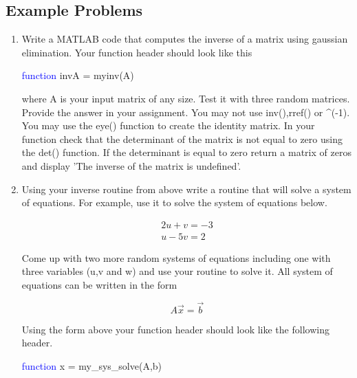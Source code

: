 \subsection{Example Problems}

\begin{enumerate}

\item Write a MATLAB code that computes the inverse of a matrix using
  gaussian elimination. Your function header should look like this 

\textcolor{blue}{function} invA = myinv(A)

where A is your input matrix of any size. Test it with three random
matrices. Provide the answer in your assignment. You may not use
inv(),rref() or \textrm{\^}(-1). You may use the eye() function to
create the identity matrix. In your function check that the
determinant of the matrix is not equal to zero using the det()
function. If the determinant is equal to zero return a matrix of zeros
and display 'The inverse of the matrix is undefined'.

\item Using your inverse routine from above write a routine that will
  solve a system of equations. For example, use it to solve the system
  of equations below.

\begin{equation}
\begin{matrix}
2u + v = -3 \\
u - 5v = 2
\end{matrix}
\end{equation}

Come up with two more random systems of equations including one with
three variables (u,v and w) and use your routine to solve it. All
system of equations can be written in the form

\begin{equation}
A \vec{x} = \vec{b}
\end{equation}

Using the form above your function header should look like the
following header.

\textcolor{blue}{function} x = my\_sys\_solve(A,b)

\end{enumerate}
